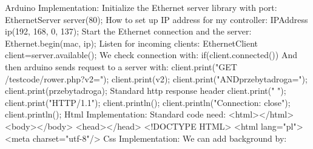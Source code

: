 Arduino Implementation:\newline
Initialize the Ethernet server library with port:\newline
EthernetServer server(80);\newline
How to set up IP address for my controller:\newline
IPAddress ip(192, 168, 0, 137);\newline
Start the Ethernet connection and the server:\newline
Ethernet.begin(mac, ip);\newline
Listen for incoming clients:\newline
EthernetClient client=server.available();\newline
\newline
\newline
We check connection with:\newline
if(client.connected())\newline
And then arduino sends request to a server with:\newline
client.print("GET /testcode/rower.php?v2=");\newline
client.print(v2);\newline
client.print("ANDprzebytadroga=");\newline %
client.print(przebytadroga);\newline
Standard http response header\newline
client.print(" ");\newline
client.print("HTTP/1.1");\newline
client.println();\newline
client.println("Connection: close");\newline
client.println();\newline
\newline
\newline
Html Implementation:\newline
Standard code need:\newline
<html></html>\newline
<body></body>\newline
<head></head>\newline
<!DOCTYPE HTML>\newline
<html lang="pl">\newline
<meta charset="utf-8"/>\newline
\newline
Css Implementation:\newline
We can add background by:\newline
